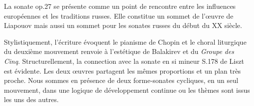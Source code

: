 La sonate op.27 se présente comme un point de rencontre entre les influences européennes et les traditions russes. Elle constitue un sommet de l'œuvre de Liapouov mais aussi un sommet pour les sonates russes du début du XX\ieme{} siècle.

Stylistiquement, l'écriture évoquent le pianisme de Chopin et le choral liturgique du deuxième mouvement renvoie à l'estétique de Balakirev et du \emph{Groupe des Cinq}. Structurellement, la connection avec la sonate en si mineur S.178 de Liszt est évidente. Les deux œuvres partagent les mêmes proportions et un plan très proche. Nous sommes en présence de deux forme-sonates cycliques, en un seul mouvement, dans une logique de développement continue ou les thèmes sont issus les uns des autres.


